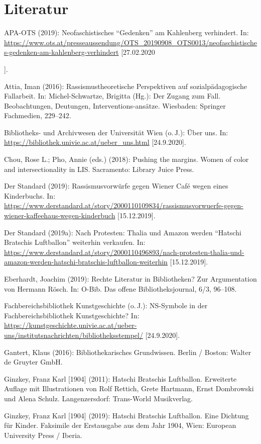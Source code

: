 \documentclass[a4paper,
fontsize=11pt,
oneside,
numbers=noperiodatend,
parskip=half-,
bibliography=totoc,
final
]{scrartcl}
\begin{document}
\hypertarget{literatur}{%
\section{Literatur}\label{literatur}}

APA-OTS (2019): Neofaschistisches \enquote{Gedenken} am Kahlenberg verhindert.
In:
\url{https://www.ots.at/presseaussendung/OTS_20190908_OTS0013/neofaschistisches-gedenken-am-kahlenberg-verhindert}
[27.02.2020{].

Attia, Iman (2016): Rassismustheoretische Perspektiven auf
sozialpädagogische Fallarbeit. In: Michel-Schwartze, Brigitta (Hg.): Der
Zugang zum Fall. Beobachtungen, Deutungen, Interventions-ansätze.
Wiesbaden: Springer Fachmedien, 229--242.

Bibliotheks- und Archivwesen der Universität Wien (o.\,J.): Über uns.
In: \url{https://bibliothek.univie.ac.at/ueber_uns.html}
[24.9.2020].

Chou, Rose L.; Pho, Annie (eds.) (2018): Pushing the margins. Women of
color and intersectionality in LIS. Sacramento: Library Juice Press.

Der Standard (2019): Rassismusvorwürfe gegen Wiener Café wegen eines
Kinderbuchs. In:
\url{https://www.derstandard.at/story/2000110109834/rassismusvorwuerfe-gegen-wiener-kaffeehaus-wegen-kinderbuch}
[15.12.2019].

Der Standard (2019a): Nach Protesten: Thalia und Amazon werden \enquote{Hatschi
Bratschis Luftballon} weiterhin verkaufen. In:
\url{https://www.derstandard.at/story/2000110496893/nach-protesten-thalia-und-amazon-werden-hatschi-bratschis-luftballon-weiterhin}
[15.12.2019].

Eberhardt, Joachim (2019): Rechte Literatur in Bibliotheken? Zur
Argumentation von Hermann Rösch. In: O-Bib. Das offene
Bibliotheksjournal, 6/3, 96--108.

Fachbereichsbibliothek Kunstgeschichte (o.\,J.): NS-Symbole in der
Fachbereichsbibliothek Kunstgeschichte? In:
\url{https://kunstgeschichte.univie.ac.at/ueber-uns/institutsnachrichten/bibliotheksstempel/}
[24.9.2020].

Gantert, Klaus (2016): Bibliothekarisches Grundwissen. Berlin / Boston:
Walter de Gruyter GmbH.

Ginzkey, Franz Karl [1904] (2011): Hatschi Bratschis Luftballon.
Erweiterte Auflage mit Illustrationen von Rolf Rettich, Grete Hartmann,
Ernst Dombrowski und Alena Schulz. Langenzersdorf: Trans-World
Musikverlag.

Ginzkey, Franz Karl [1904] (2019): Hatschi Bratschis Luftballon.
Eine Dichtung für Kinder. Faksimile der Erstausgabe aus dem Jahr 1904,
Wien: European University Press / Iberia.

}
\end{document}
